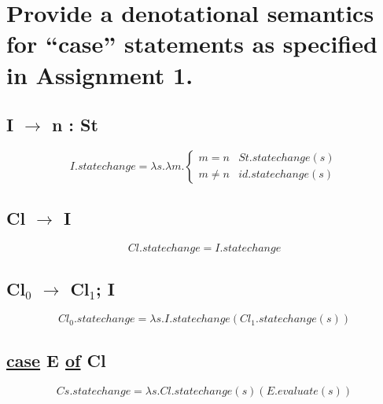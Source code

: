 \section{Provide a denotational semantics for ``case'' statements as specified in Assignment 1.}
\subsection{I $\rightarrow$ n : St}
\begin{equation}
	I.statechange = \lambda s. \lambda m. \left\{
		\begin{array}{rl}
			m = n		& St.statechange( s ) \\
			m \neq n	& id.statechange( s )
		\end{array} \right.
\end{equation}

\subsection{Cl $\rightarrow$ I}
\begin{equation}
	Cl.statechange = I.statechange
\end{equation}

\subsection{Cl$_0$ $\rightarrow$ Cl$_1$; I}
\begin{equation}
	Cl_0.statechange = \lambda s. I.statechange( Cl_1.statechange( s ) )
\end{equation}

\subsection{\underline{case} E \underline{of} Cl}
\begin{equation}
	Cs.statechange = \lambda s. Cl.statechange( s )( E.evaluate( s ) )
\end{equation}